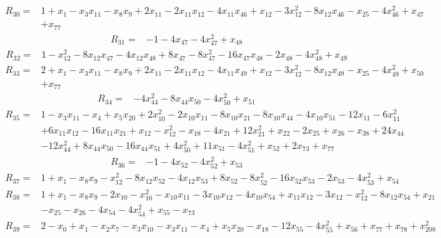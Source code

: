 \begin{align*}
 R_{30}={}&1 +x_{1} -x_{3}x_{11} -x_{8}x_{9} +2x_{11} -2x_{11}x_{12} -4x_{11}x_{46} +x_{12} -3x_{12}^{2} -8x_{12}x_{46} -x_{25} -4x_{46}^{2} +x_{47}\\
 &+x_{77}
\end{align*}
\begin{align*}
 R_{31}={}&-1 -4x_{47} -4x_{47}^{2} +x_{48}
\end{align*}
\begin{align*}
 R_{32}={}&1 -x_{12}^{2} -8x_{12}x_{47} -4x_{12}x_{48} +8x_{47} -8x_{47}^{2} -16x_{47}x_{48} -2x_{48} -4x_{48}^{2} +x_{49}
\end{align*}
\begin{align*}
 R_{33}={}&2 +x_{1} -x_{3}x_{11} -x_{8}x_{9} +2x_{11} -2x_{11}x_{12} -4x_{11}x_{49} +x_{12} -3x_{12}^{2} -8x_{12}x_{49} -x_{25} -4x_{49}^{2} +x_{50}\\
 &+x_{77}
\end{align*}
\begin{align*}
 R_{34}={}&-4x_{44}^{2} -8x_{44}x_{50} -4x_{50}^{2} +x_{51}
\end{align*}
\begin{align*}
 R_{35}={}&1 -x_{3}x_{11} -x_{4} +x_{5}x_{20} +2x_{10}^{2} -2x_{10}x_{11} -8x_{10}x_{21} -8x_{10}x_{44} -4x_{10}x_{51} -12x_{11} -6x_{11}^{2}\\
 &+6x_{11}x_{12} -16x_{11}x_{21} +x_{12} -x_{12}^{2} -x_{18} -4x_{21} +12x_{21}^{2} +x_{22} -2x_{25} +x_{26} -x_{38} +24x_{44}\\
 &-12x_{44}^{2} +8x_{44}x_{50} -16x_{44}x_{51} +4x_{50}^{2} +11x_{51} -4x_{51}^{2} +x_{52} +2x_{73} +x_{77}
\end{align*}
\begin{align*}
 R_{36}={}&-1 -4x_{52} -4x_{52}^{2} +x_{53}
\end{align*}
\begin{align*}
 R_{37}={}&1 +x_{1} -x_{8}x_{9} -x_{12}^{2} -8x_{12}x_{52} -4x_{12}x_{53} +8x_{52} -8x_{52}^{2} -16x_{52}x_{53} -2x_{53} -4x_{53}^{2} +x_{54}
\end{align*}
\begin{align*}
 R_{38}={}&1 +x_{1} -x_{8}x_{9} -2x_{10} -x_{10}^{2} -x_{10}x_{11} -3x_{10}x_{12} -4x_{10}x_{54} +x_{11}x_{12} -3x_{12} -x_{12}^{2} -8x_{12}x_{54} +x_{21}\\
 &-x_{25} -x_{26} -4x_{54} -4x_{54}^{2} +x_{55} -x_{73}
\end{align*}
\begin{align*}
 R_{39}={}&2 -x_{0} +x_{1} -x_{2}x_{7} -x_{3}x_{10} -x_{3}x_{11} -x_{4} +x_{5}x_{20} -x_{18} -12x_{55} -4x_{55}^{2} +x_{56} +x_{77} +x_{78} +x_{208}^{2}
\end{align*}
